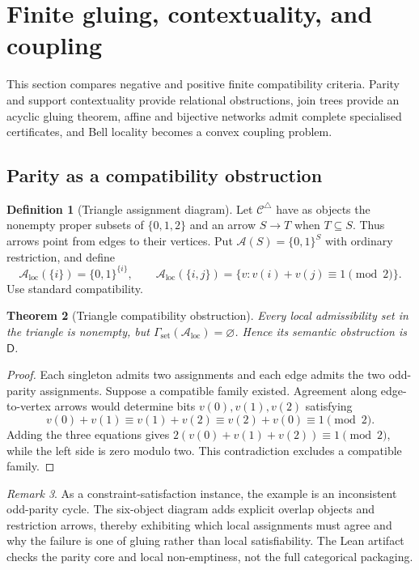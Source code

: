 \documentclass[11pt]{article}
\theoremstyle{plain}
\newtheorem{theorem}{Theorem}[section]
\theoremstyle{definition}
\newtheorem{definition}[theorem]{Definition}
\theoremstyle{remark}
\newtheorem{remark}[theorem]{Remark}
\newcommand{\LocalAdm}{\mathcal{A}_{\mathrm{loc}}}
\begin{document}
\section{Finite gluing, contextuality, and coupling}\label{sec:Dtri}

This section compares negative and positive finite compatibility criteria. Parity and
support contextuality provide relational obstructions, join trees provide an
acyclic gluing theorem, affine and bijective networks admit complete specialised
certificates, and Bell locality becomes a convex coupling problem.

\subsection{Parity as a compatibility obstruction}

\begin{definition}[Triangle assignment diagram]\label{def:triangle}
Let $\mathcal C^\triangle$ have as objects the nonempty proper subsets of
$\{0,1,2\}$ and an arrow $S\to T$ when $T\subseteq S$. Thus arrows point from
edges to their vertices. Put $\mathcal A(S)=\{0,1\}^S$ with ordinary
restriction, and define
\[
\LocalAdm(\{i\})=\{0,1\}^{\{i\}},\qquad
\LocalAdm(\{i,j\})=
\{v:v(i)+v(j)\equiv1\pmod2\}.
\]
Use standard compatibility.
\end{definition}

\begin{theorem}[Triangle compatibility obstruction]\label{thm:Dtri}
Every local admissibility set in the triangle is nonempty, but
$\Gamma_{\mathrm{set}}(\LocalAdm)=\varnothing$. Hence its semantic obstruction
is $\mathsf D$.
\end{theorem}

\begin{proof}
Each singleton admits two assignments and each edge admits the two odd-parity
assignments. Suppose a compatible family existed. Agreement along edge-to-vertex
arrows would determine bits $v(0),v(1),v(2)$ satisfying
\[
v(0)+v(1)\equiv v(1)+v(2)\equiv v(2)+v(0)\equiv1\pmod2.
\]
Adding the three equations gives
$2(v(0)+v(1)+v(2))\equiv1\pmod2$, while the left side is zero modulo two. This
contradiction excludes a compatible family.
\end{proof}

\begin{remark}\label{rem:triangle-lean}
As a constraint-satisfaction instance, the example is an inconsistent
odd-parity cycle. The six-object diagram adds explicit overlap objects and
restriction arrows, thereby exhibiting which local assignments must agree and
why the failure is one of gluing rather than local satisfiability. The Lean
artifact checks the parity core and local non-emptiness, not the full categorical
packaging.
\end{remark}
\end{document}
